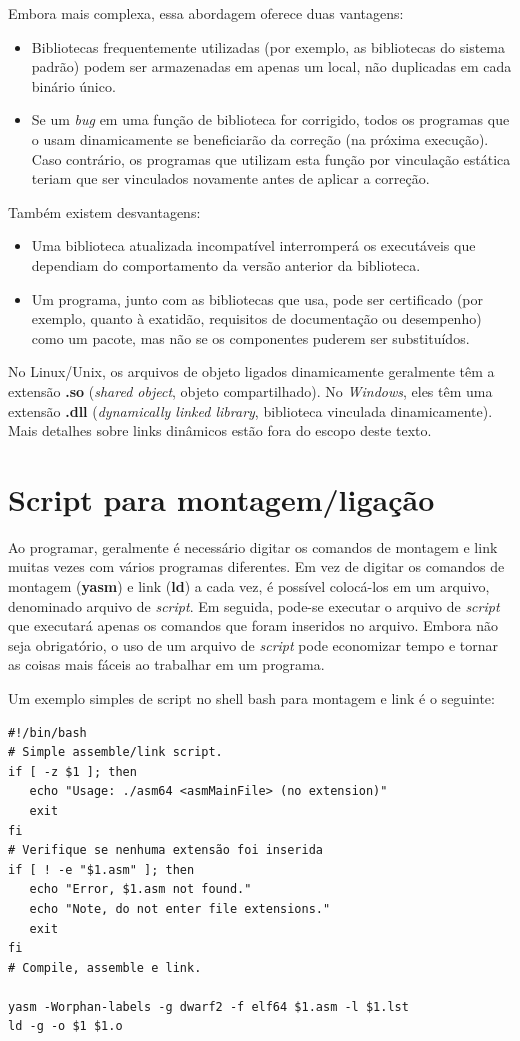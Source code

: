 Embora mais complexa, essa abordagem oferece duas vantagens:\begin{itemize}
	\item Bibliotecas frequentemente utilizadas (por exemplo, as bibliotecas do sistema padrão) podem ser armazenadas em apenas um local, não duplicadas em cada binário único.
	\item Se um \textit{bug} em uma função de biblioteca for corrigido, todos os programas que o usam dinamicamente se beneficiarão da correção (na próxima execução). Caso contrário, os programas que utilizam esta função por vinculação estática teriam que ser vinculados novamente antes de aplicar a correção.
\end{itemize}

Também existem desvantagens:
\begin{itemize}
	\item Uma biblioteca atualizada incompatível interromperá os executáveis que dependiam do comportamento da versão anterior da biblioteca.
	\item Um programa, junto com as bibliotecas que usa, pode ser certificado (por exemplo, quanto à exatidão, requisitos de documentação ou desempenho) como um pacote, mas não se os componentes puderem ser substituídos.
\end{itemize}

No Linux/Unix, os arquivos de objeto ligados dinamicamente geralmente têm a extensão \textbf{.so} (\textit{shared object}, objeto compartilhado). No \textit{Windows}, eles têm uma extensão \textbf{.dll} (\textit{dynamically linked library}, biblioteca vinculada dinamicamente). Mais detalhes sobre links dinâmicos estão fora do escopo deste texto.

\section{Script para montagem/ligação}
Ao programar, geralmente é necessário digitar os comandos de montagem e link muitas vezes com vários programas diferentes. Em vez de digitar os comandos de montagem (\textbf{yasm}) e link (\textbf{ld}) a cada vez, é possível colocá-los em um arquivo, denominado arquivo de \textit{script}. Em seguida, pode-se executar o arquivo de \textit{script} que executará apenas os comandos que foram inseridos no arquivo. Embora não seja obrigatório, o uso de um arquivo de \textit{script} pode economizar tempo e tornar as coisas mais fáceis ao trabalhar em um programa.

Um exemplo simples de script no shell bash para montagem e link é o seguinte:
\begin{verbatim}
#!/bin/bash
# Simple assemble/link script.
if [ -z $1 ]; then
   echo "Usage: ./asm64 <asmMainFile> (no extension)"
   exit
fi
# Verifique se nenhuma extensão foi inserida
if [ ! -e "$1.asm" ]; then
   echo "Error, $1.asm not found."
   echo "Note, do not enter file extensions."
   exit
fi
# Compile, assemble e link.

yasm -Worphan-labels -g dwarf2 -f elf64 $1.asm -l $1.lst
ld -g -o $1 $1.o
\end{verbatim}

